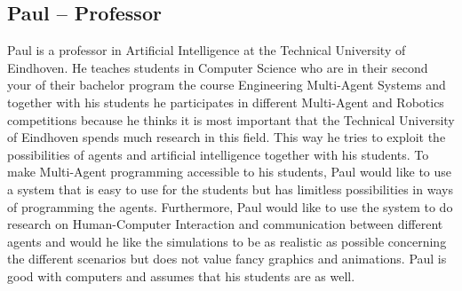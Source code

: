 \subsection{Paul – Professor}
Paul is a professor in Artificial Intelligence at the Technical University of Eindhoven. He teaches students in Computer Science who are in their second your of their bachelor program the course Engineering Multi-Agent Systems and together with his students he participates in different Multi-Agent and Robotics competitions because he thinks it is most important that the Technical University of Eindhoven spends much research in this field. This way he tries to exploit the possibilities of agents and artificial intelligence together with his students. 
To make Multi-Agent programming accessible to his students, Paul would like to use a system that is easy to use for the students but has limitless possibilities in ways of programming the agents. Furthermore, Paul would like to use the system to do research on Human-Computer Interaction and communication between different agents and would he like the simulations to be as realistic as possible concerning the different scenarios but does not value fancy graphics and animations. Paul is good with computers and assumes that his students are as well.
